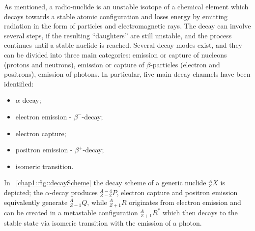 As mentioned, a radio-nuclide is an unstable isotope of a chemical element which decays towards a stable atomic configuration and loses energy by emitting radiation in the form of particles and electromagnetic rays. The decay can involve several steps, if the resulting \enquote{daughters} are still unstable, and the process continues until a stable nuclide is reached.
Several decay modes exist, and they can be divided into three main categories: emission or capture of nucleons (protons and neutrons), emission or capture of $\beta$-particles (electron and positrons), emission of photons. In particular, five main decay channels have been identified:
\begin{itemize}
\item $\alpha$-decay;
\item electron emission - $\beta^-$-decay;
\item electron capture;
\item positron emission - $\beta^+$-decay;
\item isomeric transition.
\end{itemize}
In \figurename~\ref{chap1::fig::decayScheme} the decay scheme of a generic nuclide $^{A}_{Z}X$ is depicted; the $\alpha$-decay produces $^{A-4}_{Z-2}P$, electron capture and positron emission equivalently generate $^{A}_{Z-1}Q$, while $^{A}_{Z+1}R$ originates from electron emission and can be created in a metastable configuration $^{A}_{Z+1}R^*$ which then decays to the stable state via isomeric transition with the emission of a photon.  

